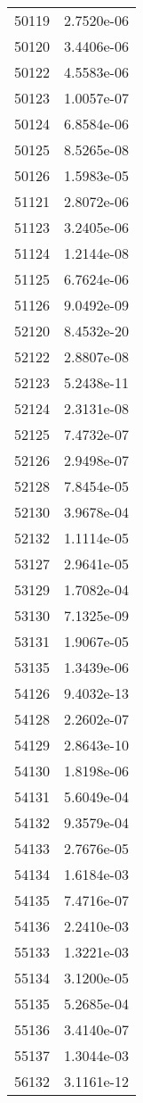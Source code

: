 \begin{table}[h!]
\begin{tabular}{|| c || c |}
50119 & 2.7520e-06 \\
50120 & 3.4406e-06 \\
50122 & 4.5583e-06 \\
50123 & 1.0057e-07 \\
50124 & 6.8584e-06 \\
50125 & 8.5265e-08 \\
50126 & 1.5983e-05 \\
51121 & 2.8072e-06 \\
51123 & 3.2405e-06 \\
51124 & 1.2144e-08 \\
51125 & 6.7624e-06 \\
51126 & 9.0492e-09 \\
52120 & 8.4532e-20 \\
52122 & 2.8807e-08 \\
52123 & 5.2438e-11 \\
52124 & 2.3131e-08 \\
52125 & 7.4732e-07 \\
52126 & 2.9498e-07 \\
52128 & 7.8454e-05 \\
52130 & 3.9678e-04 \\
52132 & 1.1114e-05 \\
53127 & 2.9641e-05 \\
53129 & 1.7082e-04 \\
53130 & 7.1325e-09 \\
53131 & 1.9067e-05 \\
53135 & 1.3439e-06 \\
54126 & 9.4032e-13 \\
54128 & 2.2602e-07 \\
54129 & 2.8643e-10 \\
54130 & 1.8198e-06 \\
54131 & 5.6049e-04 \\
54132 & 9.3579e-04 \\
54133 & 2.7676e-05 \\
54134 & 1.6184e-03 \\
54135 & 7.4716e-07 \\
54136 & 2.2410e-03 \\
55133 & 1.3221e-03 \\
55134 & 3.1200e-05 \\
55135 & 5.2685e-04 \\
55136 & 3.4140e-07 \\
55137 & 1.3044e-03 \\
56132 & 3.1161e-12 \\

\end{tabular}
\end{table}
